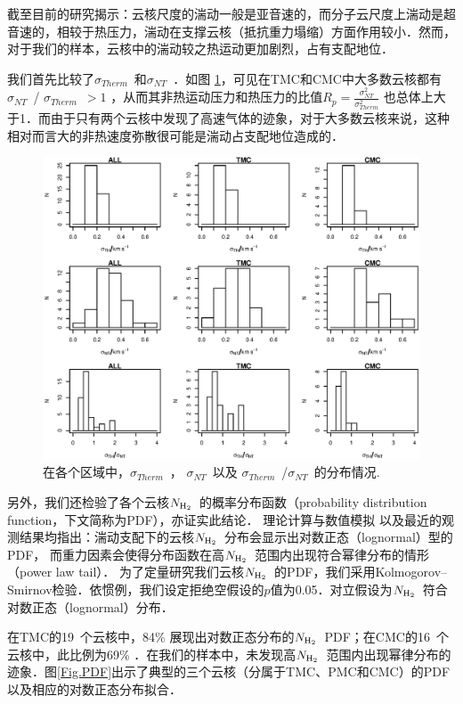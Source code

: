 \documentclass[UTF8, nocolorlinks]{pkuthss}
\newcommand{\nhyd}{$N_{\rm H_2}$\ }
\newcommand{\sigmath}{$\sigma _{Therm}$\ }
\newcommand{\sigmant}{$\sigma _{NT}$\ }
\newcommand{\numcoretmc}{19\ }
\newcommand{\numcorecmc}{16\ }
\begin{document}
		截至目前的研究揭示：云核尺度的湍动一般是亚音速的，而分子云尺度上湍动是超音速的，相较于热压力，湍动在支撑云核（抵抗重力塌缩）方面作用较小\supercite{1983ApJ...270..105M,2004A&A...416..191T}．然而，对于我们的样本，云核中的湍动较之热运动更加剧烈，占有支配地位．

		我们首先比较了\sigmath 和\sigmant ．如图 \ref{Fig.SigmaTH/SigmaNT}，可见在TMC和CMC中大多数云核都有\sigmant / \sigmath $>1$ ，从而其非热运动压力和热压力的比值$R_p=\frac{\sigma^2_{NT}}{\sigma^2_{Therm} }$ 也总体上大于1．而由于只有两个云核中发现了高速气体的迹象，对于大多数云核来说，这种相对而言大的非热速度弥散很可能是湍动占支配地位造成的．

		\begin{figure}[htbp]
		\includegraphics[totalheight=120mm]{img_plot/VelocityComparison.eps}
		\caption{在各个区域中，\sigmath ， \sigmant 以及 \sigmath/\sigmant 的分布情况.\label{Fig.SigmaTH/SigmaNT}}
		\end{figure}

		另外，我们还检验了各个云核\nhyd 的概率分布函数（probability distribution function，下文简称为PDF），亦证实此结论．
		理论计算与数值模拟\supercite{2011MNRAS.416.1436B} 以及最近的观测结果\supercite{2013ApJ...766L..17S}均指出：湍动支配下的云核\nhyd 分布会显示出对数正态（lognormal）型的PDF， 而重力因素会使得分布函数在高\nhyd 范围内出现符合幂律分布的情形（power law tail）． 
		为了定量研究我们云核\nhyd 的PDF，我们采用Kolmogorov–Smirnov检验．依惯例，我们设定拒绝空假设的$p$值为0.05．对立假设为\nhyd 符合对数正态（lognormal）分布．

		在TMC的\numcoretmc 个云核中，84\% 展现出对数正态分布的\nhyd PDF；在CMC的\numcorecmc 个云核中，此比例为69\% ．在我们的样本中，未发现高\nhyd 范围内出现幂律分布的迹象．图\ref{Fig.PDF}出示了典型的三个云核（分属于TMC、PMC和CMC）的PDF以及相应的对数正态分布拟合．
\end{document}
